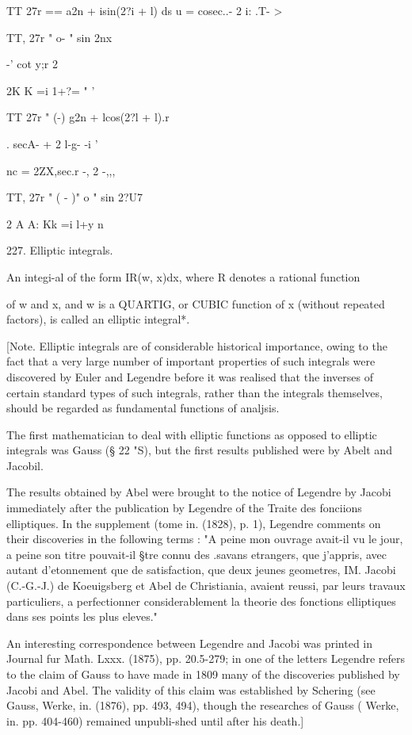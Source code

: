 TT 27r == a2n + isin(2?i + l) ds u = cosec..- 2 i: .T- >

TT, 27r " o- " sin 2nx

-' cot y;r 2

2K K =i 1+?= " '

TT 27r " (-) g2n + lcos(2?l + l).r

 . secA- + 2 l-g- -i '

nc = 2ZX,sec.r -, 2 -,,,

TT, 27r " ( - )" o " sin 2?U7

2 A A: Kk =i l+y n

227. Elliptic integrals.

An integi-al of the form IR(w, x)dx, where R denotes a rational
function

of w and x, and w is a QUARTIG, or CUBIC function of x (without
repeated factors), is called an elliptic integral*.

[Note. Elliptic integrals are of considerable historical importance,
owing to the fact that a very large number of important properties of
such integrals were discovered by Euler and Legendre before it was
realised that the inverses of certain standard types of such
integrals, rather than the integrals themselves, should be regarded as
fundamental functions of analjsis.

The first mathematician to deal with elliptic functions as opposed to
elliptic integrals was Gauss (§ 22 "S), but the first results
published were by Abelt and Jacobil.

The results obtained by Abel were brought to the notice of Legendre by
Jacobi immediately after the publication by Legendre of the Traite des
fonciions elliptiques. In the supplement (tome in. (1828), p. 1),
Legendre comments on their discoveries in the following terms : "A
peine mon ouvrage avait-il vu le jour, a peine son titre pouvait-il
§tre connu des .savans etrangers, que j'appris, avec autant
d'etonnement que de satisfaction, que deux jeunes geometres, IM.
Jacobi (C.-G.-J.) de Koeuigsberg et Abel de Christiania, avaient
reussi, par leurs travaux particuliers, a perfectionner
considerablement la theorie des fonctions elliptiques dans ses points
les plus eleves."

An interesting correspondence between Legendre and Jacobi was printed
in Journal fur Math. Lxxx. (1875), pp. 20.5-279; in one of the letters
Legendre refers to the claim of Gauss to have made in 1809 many of the
discoveries published by Jacobi and Abel. The validity of this claim
was established by Schering (see Gauss, Werke, in. (1876), pp. 493,
494), though the researches of Gauss ( Werke, in. pp. 404-460)
remained unpubli-shed until after his death.]

